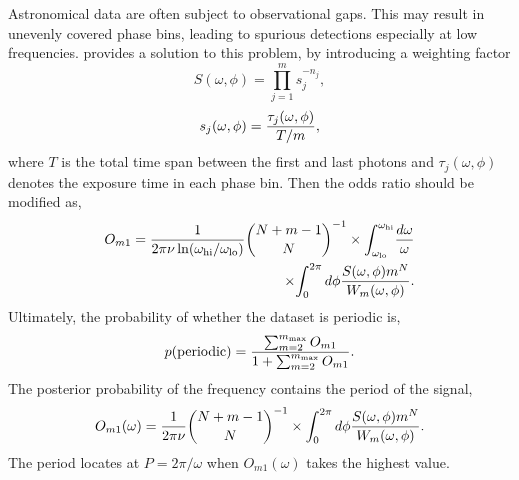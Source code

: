 \documentclass[fleqn,usenatbib]{mnras}
\begin{document}
Astronomical data are often subject to observational gaps. %
This may result in unevenly covered phase bins, leading to spurious detections especially at low frequencies. \cite{1992ApJ...398..146G} provides a solution to this problem, by introducing a weighting factor 
\begin{equation}\label{A17}
S(\omega,\phi)={\prod_{j=1}^m s_j^{-n_j}},
\end{equation}
\begin{equation}
s_j(\omega,\phi)={{\tau_{j}(\omega,\phi)}\over {T/m}},
\end{equation}
where $T$ is the total time span between the first and last photons and ${\tau_{j}(\omega,\phi)}$ denotes the exposure time in each phase bin.
Then the odds ratio should be modified as,
\begin{equation}\label{A19}
\begin{split}
O_{m1}={1\over{2\pi \nu \ln(\omega_{\rm hi}/\omega_{\rm lo})}} {{N+m-1}	\choose N}^{-1}\times {\int_{\omega_{\rm lo}}^{\omega_{\rm hi}}}{{d\omega}\over{\omega}}\\
\times {\int_0^{2\pi}d\phi{S(\omega,\phi)m^N\over W_m(\omega,\phi)}}.
\end{split} 
\end{equation}
Ultimately, the probability of whether the dataset is periodic is,
\begin{equation}\label{A20}
p({\rm periodic})={{\sum_{m=2}^{m_{\rm max}} O_{m1}}\over {1+\sum_{m=2}^{m_{\rm max}} O_{m1}}}.
\end{equation}
The posterior probability of the frequency contains the period of the signal,
\begin{equation}\label{A21}
O_{m1}(\omega)={1\over{2\pi \nu}} {{N+m-1}	\choose N}^{-1} \times {\int_0^{2\pi}d\phi{S(\omega,\phi)m^N\over W_m(\omega,\phi)}}.
\end{equation}
The period locates at $P=2\pi /\omega $ when $O_{m1}(\omega)$ takes the highest value.
\end{document}

